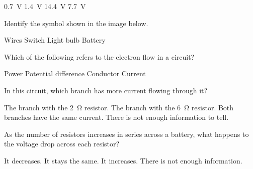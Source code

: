 \documentclass[]{exam}
\begin{document}
\begin{questions}
\begin{randomizechoices}
    \choice \SI{0.7}{V}
    \choice \SI{1.4}{V}
    \correctchoice \SI{14.4}{V}
    \choice \SI{7.7}{V}
\end{randomizechoices}


\question
Identify the symbol shown in the image below.

\begin{center}
\end{center}

\begin{randomizechoices}
    \choice Wires
    \choice Switch
    \choice Light bulb
    \correctchoice Battery 
\end{randomizechoices}

\question
Which of the following refers to the electron flow in a circuit?

\begin{randomizechoices}
    \choice Power
    \choice Potential difference
    \choice Conductor
    \correctchoice Current
\end{randomizechoices}

\question
In this circuit, which branch has more current flowing through it?

\begin{center}
\end{center}

\begin{randomizechoices}[keeplast]
    \correctchoice The branch with the \SI{2}{\ohm} resistor.
    \choice The branch with the \SI{6}{\ohm} resistor.
    \choice Both branches have the same current.
    \choice There is not enough information to tell.
\end{randomizechoices}

\question
As the number of resistors increases in series across a battery, what happens to the voltage drop across each resistor?

\begin{randomizechoices}[keeplast]
    \correctchoice It decreases.
    \choice It stays the same.
    \choice It increases.
    \choice There is not enough information.
\end{randomizechoices}



\end{questions}
\end{document}
